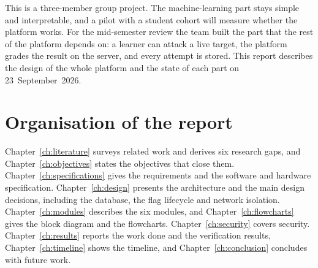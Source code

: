 This is a three-member group project. The machine-learning part stays simple and interpretable, and a pilot with a student cohort will measure whether the platform works. For the mid-semester review the team built the part that the rest of the platform depends on: a learner can attack a live target, the platform grades the result on the server, and every attempt is stored. This report describes the design of the whole platform and the state of each part on 23~September~2026.

\section{Organisation of the report}

Chapter~\ref{ch:literature} surveys related work and derives six research gaps, and Chapter~\ref{ch:objectives} states the objectives that close them. Chapter~\ref{ch:specifications} gives the requirements and the software and hardware specification. Chapter~\ref{ch:design} presents the architecture and the main design decisions, including the database, the flag lifecycle and network isolation. Chapter~\ref{ch:modules} describes the six modules, and Chapter~\ref{ch:flowcharts} gives the block diagram and the flowcharts. Chapter~\ref{ch:security} covers security. Chapter~\ref{ch:results} reports the work done and the verification results, Chapter~\ref{ch:timeline} shows the timeline, and Chapter~\ref{ch:conclusion} concludes with future work.
